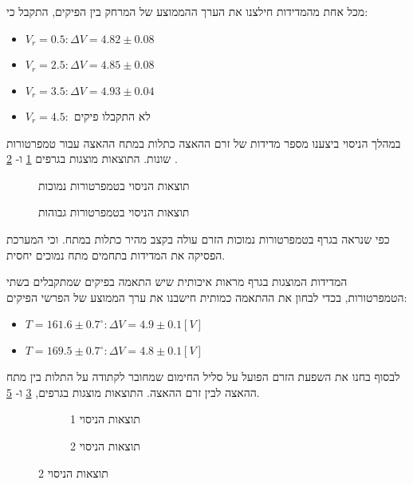 \documentclass{article}
\begin{document}
מכל אחת מהמדידות חילצנו את הערך ההממוצע של המרחק בין הפיקים, התקבל כי:
\begin{itemize}
    \item $V_r=0.5: \Delta V =4.82 \pm 0.08$
    \item $V_r=2.5: \Delta V =4.85 \pm 0.08$
    \item $V_r=3.5: \Delta V =4.93 \pm 0.04$
    \item $V_r=4.5:$ לא התקבלו פיקים
\end{itemize}

במהלך הניסוי ביצענו מספר מדידות של זרם ההאצה כתלות במתח ההאצה עבור טמפרטורות שונות.
התוצאות מוצגות בגרפים
\ref{fig:Changing_temp_0-10v}
ו-
\ref{fig:Changing_temp_0-30v}
.

\begin{graph}[H]
    \begin{subfigure}[b]{\textwidth}
    	\centering
    	\resizebox{\textwidth}{!}{}
    	\caption{תוצאות הניסוי בטמפרטורות נמוכות}
    	\label{fig:Changing_temp_0-10v}
    \end{subfigure}
    \hfill
    \begin{subfigure}[b]{\textwidth}
    	\centering
    	\resizebox{\textwidth}{!}{}
    	\caption{תוצאות הניסוי בטמפרטורות גבוהות}
    	\label{fig:Changing_temp_0-30v}
    \end{subfigure}
    \label{fig:Changing_temp}
\end{graph}

כפי שנראה בגרף 
\label{fig:Changing_temp_0-10v}
בטמפרטורות נמוכות הזרם עולה בקצב מהיר כתלות במתח. 
וכי המערכת הפסיקה את המדידות בתחמים מתח נמוכים יחסית.

המדידות המוצגות בגרף
\label{fig:Changing_temp_0-30v}
מראות איכותית שיש התאמה בפיקים שמתקבלים בשתי הטמפרטורות, בכדי לבחון את ההתאמה כמותית חישבנו את ערך הממוצע של הפרשי הפיקים:
\begin{itemize}
    \item $T = 161.6 \pm 0.7 ^{\circ}:\Delta V = 4.9 \pm 0.1  [V]$ 
    \item $T = 169.5 \pm 0.7 ^{\circ}:\Delta V = 4.8 \pm 0.1  [V]$ 
\end{itemize}

לבסוף בחנו את השפעת הזרם הפועל על סליל החימום שמחובר לקתודה על התלות בין מתח ההאצה לבין זרם ההאצה.
התוצאות מוצגות בגרפים,
\ref{fig:Changing_Ih_25-28mA}
ו-
\ref{fig:Changing_Ih_23-28mA}.
\begin{figure}[H]
    \begin{subfigure}[b]{\textwidth}
    	\centering
    	\resizebox{\textwidth}{!}{}
    	\caption{תוצאות הניסוי 1}
    	\label{fig:Changing_Ih_25-28mA}
    \end{subfigure}
    \hfill
    \begin{subfigure}[b]{\textwidth}
    	\centering
    	\resizebox{\textwidth}{!}{}
    	\caption{תוצאות הניסוי 2}
    	\label{fig:Changing_Ih_23-28mA}
    \end{subfigure}
\end{figure}
\end{document}
